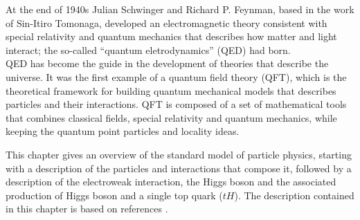 
\noindent At the end of 1940s Julian Schwinger\cite{schwinger} and Richard P. Feynman\cite{feynman}, based in the work of Sin-Itiro Tomonaga\cite{tomonaga}, developed an electromagnetic theory consistent with special relativity and quantum mechanics that describes how matter and light interact; the so-called ``quantum eletrodynamics'' (QED) had born.\\%

\noindent QED has become the guide in the development of theories that describe the universe. It was the first example of a quantum field theory (QFT), which is the theoretical framework for building quantum mechanical models that describes particles and their interactions. QFT is composed of a set of mathematical tools that combines classical fields, special relativity and quantum mechanics, while keeping the quantum point particles and locality ideas.

\noindent This chapter gives an overview of the standard model of particle physics, starting with a description of the particles and interactions that compose it, followed by a description of the electroweak interaction, the Higgs boson and the associated production of Higgs boson and a single top quark ($tH$). The description contained in this chapter is based on references \cite{griffiths, mandl, halzen}.  %

